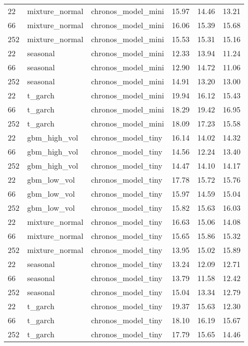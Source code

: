 {\begin{tabular}{lllrrr}
\midrule
22 & mixture\_normal & chronos\_model\_mini & 15.97 & 14.46 & 13.21 \\
66 & mixture\_normal & chronos\_model\_mini & 16.06 & 15.39 & 15.68 \\
252 & mixture\_normal & chronos\_model\_mini & 15.53 & 15.31 & 15.16 \\
\midrule
22 & seasonal & chronos\_model\_mini & 12.33 & 13.94 & 11.24 \\
66 & seasonal & chronos\_model\_mini & 12.90 & 14.72 & 11.06 \\
252 & seasonal & chronos\_model\_mini & 14.91 & 13.20 & 13.00 \\
\midrule
22 & t\_garch & chronos\_model\_mini & 19.94 & 16.12 & 15.43 \\
66 & t\_garch & chronos\_model\_mini & 18.29 & 19.42 & 16.95 \\
252 & t\_garch & chronos\_model\_mini & 18.09 & 17.23 & 15.58 \\
\midrule
22 & gbm\_high\_vol & chronos\_model\_tiny & 16.14 & 14.02 & 14.32 \\
66 & gbm\_high\_vol & chronos\_model\_tiny & 14.56 & 12.24 & 13.40 \\
252 & gbm\_high\_vol & chronos\_model\_tiny & 14.47 & 14.10 & 14.17 \\
\midrule
22 & gbm\_low\_vol & chronos\_model\_tiny & 17.78 & 15.72 & 15.76 \\
66 & gbm\_low\_vol & chronos\_model\_tiny & 15.97 & 14.59 & 15.04 \\
252 & gbm\_low\_vol & chronos\_model\_tiny & 15.82 & 15.63 & 16.03 \\
\midrule
22 & mixture\_normal & chronos\_model\_tiny & 16.63 & 15.06 & 14.08 \\
66 & mixture\_normal & chronos\_model\_tiny & 15.65 & 15.86 & 15.32 \\
252 & mixture\_normal & chronos\_model\_tiny & 13.95 & 15.02 & 15.89 \\
\midrule
22 & seasonal & chronos\_model\_tiny & 13.24 & 12.09 & 12.71 \\
66 & seasonal & chronos\_model\_tiny & 13.79 & 11.58 & 12.42 \\
252 & seasonal & chronos\_model\_tiny & 15.04 & 13.34 & 12.79 \\
\midrule
22 & t\_garch & chronos\_model\_tiny & 19.37 & 15.63 & 12.30 \\
66 & t\_garch & chronos\_model\_tiny & 18.10 & 16.19 & 15.67 \\
252 & t\_garch & chronos\_model\_tiny & 17.79 & 15.65 & 14.46 \\

\end{tabular}}
